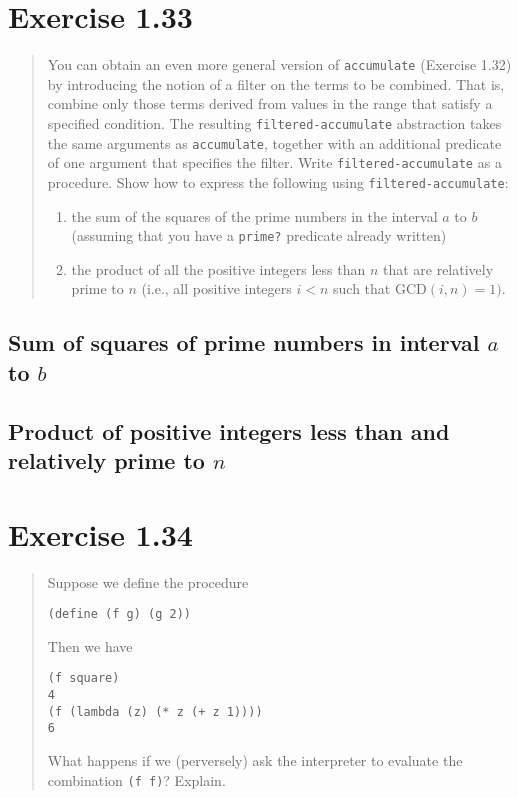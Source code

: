 \documentclass{article}
\begin{document}
\section{Exercise 1.33}
\begin{quote}
    You can obtain an even more general version of \texttt{accumulate}
    (Exercise 1.32) by introducing the notion of a filter on the terms to be
    combined. That is, combine only those terms derived from values in the
    range that satisfy a specified condition. The resulting
    \texttt{filtered-accumulate} abstraction takes the same arguments as
    \texttt{accumulate}, together with an additional predicate of one argument
    that specifies the filter. Write \texttt{filtered-accumulate} as a
    procedure. Show how to express the following using
    \texttt{filtered-accumulate}:
    \begin{enumerate}
        \item the sum of the squares of the prime numbers in the interval $a$
            to $b$ (assuming that you have a \texttt{prime?} predicate already
            written)
        \item the product of all the positive integers less than $n$ that are
            relatively prime to $n$ (i.e., all positive integers $i<n$ such that
            $\textrm{GCD}(i,n)=1)$.
    \end{enumerate}
\end{quote}



\subsection{Sum of squares of prime numbers in interval $a$ to $b$}


\subsection{Product of positive integers less than and relatively prime to $n$}


\section{Exercise 1.34}
\begin{quote}
    Suppose we define the procedure
    \begin{lstlisting}
(define (f g) (g 2))
    \end{lstlisting}
    Then we have
    \begin{lstlisting}
(f square)
4
(f (lambda (z) (* z (+ z 1))))
6
    \end{lstlisting}
    What happens if we (perversely) ask the interpreter to evaluate the
    combination \texttt{(f f)}? Explain.
\end{quote}
\end{document}
